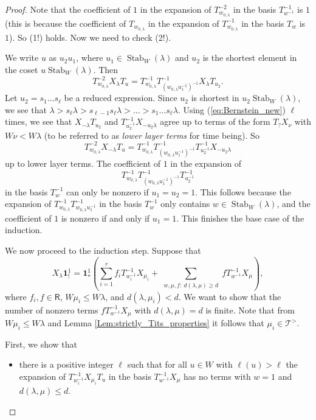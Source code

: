 \documentclass{amsart}
\newcommand{\Ring}{\mathsf{R}}
\newcommand{\bone}{\mathbf{1}}
\theoremstyle{definition}
\numberwithin{equation}{section}
\begin{document}
\begin{proof}
Note that the coefficient of $1$ in the expansion of $T_{w_{0,\lambda}}^{-2}$ in the basis $T_{w^{-1}}^{-1}$ is $1$ (this is because the coefficient of $T_{w_{0,\lambda}}$ in the expansion of $T_{w_{0,\lambda}}^{-1}$ in the basis $T_w$ is $1$). So (1!) holds. Now we need to check (2!).

We write $u$ as $u_2u_1$, where $u_1\in \operatorname{Stab}_W(\lambda)$ and $u_2$ is the shortest element in the coset $u\operatorname{Stab}_W(\lambda)$. Then
$$T_{w_{0,\lambda}}^{-2} X_{\lambda}T_u=T_{w_{0,\lambda}}^{-1}T_{(w_{0,\lambda}u_1^{-1})^{-1}}^{-1}X_{\lambda}T_{u_2}.$$
Let $u_2=s_1\ldots s_\ell$ be a reduced expression. Since $u_2$ is shortest in
$u_2\operatorname{Stab}_W(\lambda)$, we see that
$\lambda>s_\ell \lambda>s_{\ell-1}s_\ell \lambda>\ldots>s_1\ldots s_\ell \lambda$. Using
(\ref{eq:Bernstein_new}) $\ell$ times, we see that $X_{-\lambda}T_{u_2}$ and $T_{u_2^{-1}}^{-1}X_{-u_2\lambda}$ agree up to terms of the form $T_?X_\nu$ with $W\nu<W\lambda$ (to be referred to as {\it lower layer terms} for time being).
So
$$T_{w_{0,\lambda}}^{-2} X_{-\lambda}T_u=T_{w_{0,\lambda}}^{-1}T_{(w_{0,\lambda}u_1^{-1})^{-1}}^{-1}T_{u_2^{-1}}^{-1}X_{-u_2\lambda}$$
up to lower layer terms.
The coefficient of $1$ in the expansion of $$T_{w_{0,\lambda}}^{-1}T_{(w_{0,\lambda}u_1^{-1})^{-1}}^{-1}T_{u_2^{-1}}^{-1}$$ in the basis $T_w^{-1}$ can only be nonzero if $u_1=u_2=1$.
This follows because the expansion of $T_{w_{0,\lambda}}^{-1}T^{-1}_{w_{0,\lambda}u_1^{-1}}$ in the basis $T_{w}^{-1}$ only contains $w\in \operatorname{Stab}_W(\lambda)$, and the coefficient of $1$ is nonzero if and only if $u_1=1$.
This finishes the base case of the induction.

We now proceed to the induction step. Suppose that $$X_{\lambda}\bone_!^1=\bone_*^1(\sum_{i=1}^r f_i T_{w_i^{-1}}^{-1}X_{\mu_i}+\sum_{\substack{w, \mu, f:\ d(\lambda,\mu)\geqslant d}}fT_{w^{-1}}^{-1}X_\mu),$$
where $f_i, f\in \Ring$, $W\mu_i\leqslant W\lambda$, and $d(\lambda,\mu_i)<d$. We want to show that the number of nonzero terms $fT_{w^{-1}}^{-1}X_\mu$ with $d(\lambda,\mu)=d$ is finite. Note that from $W\mu_i\leqslant W\lambda$ and Lemma \ref{Lem:strictly_Tits_properties} it follows that $\mu_i\in \mathcal{T}^>$.

First, we show that
\begin{itemize}
\item[($\star$)]
there is a positive integer $\ell$ such that for all $u\in W$ with $\ell(u)>\ell$ the expansion of $T_{w_i^{-1}}^{-1}X_{\mu_i}T_u$ in the basis $T_{w^{-1}}^{-1}X_\mu$ has no terms with $w=1$ and $d(\lambda,\mu)\leqslant d$.
\end{itemize}


\end{proof}
\end{document}
